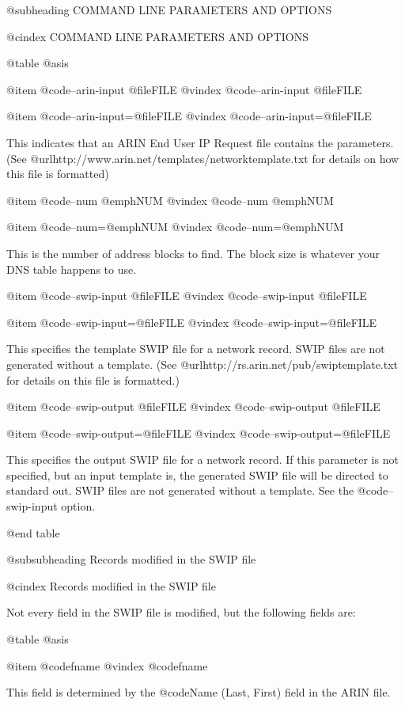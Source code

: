 @subheading COMMAND LINE PARAMETERS AND OPTIONS

@cindex COMMAND LINE PARAMETERS AND OPTIONS

@table @asis

@item @code{--arin-input }@file{FILE}
@vindex @code{--arin-input }@file{FILE}

@item @code{--arin-input=}@file{FILE}
@vindex @code{--arin-input=}@file{FILE}

This indicates that an ARIN End User IP Request file contains the parameters.
(See @url{http://www.arin.net/templates/networktemplate.txt} for details on how
this file is formatted)

@item @code{--num }@emph{NUM}
@vindex @code{--num }@emph{NUM}

@item @code{--num=}@emph{NUM}
@vindex @code{--num=}@emph{NUM}

This is the number of address blocks to find.  The block size is whatever your
DNS table happens to use.

@item @code{--swip-input }@file{FILE}
@vindex @code{--swip-input }@file{FILE}

@item @code{--swip-input=}@file{FILE}
@vindex @code{--swip-input=}@file{FILE}

This specifies the template SWIP file for a network record.  SWIP files are not
generated without a template.  (See @url{http://rs.arin.net/pub/swiptemplate.txt}
for details on this file is formatted.)

@item @code{--swip-output }@file{FILE}
@vindex @code{--swip-output }@file{FILE}

@item @code{--swip-output=}@file{FILE}
@vindex @code{--swip-output=}@file{FILE}

This specifies the output SWIP file for a network record.  If this parameter is
not specified, but an input template is, the generated SWIP file will be
directed to standard out.  SWIP files are not generated without a template.
See the @code{--swip-input} option. 

@end table

@subsubheading Records modified in the SWIP file

@cindex Records modified in the SWIP file

Not every field in the SWIP file is modified, but the following fields are:

@table @asis

@item @code{fname}
@vindex @code{fname}

This field is determined by the @code{Name (Last, First)} field in the ARIN file.

